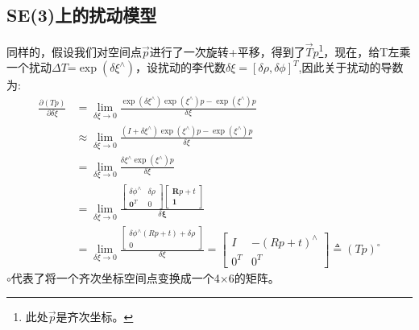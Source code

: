\subsection{SE(3)上的扰动模型}
同样的，假设我们对空间点$\vec p$进行了一次旋转+平移，得到了$\vec T p$\footnote{此处$\vec p$是齐次坐标。}，现在，给T左乘一个扰动$\Delta T$=$\exp{(\delta \xi^\wedge)}$，设扰动的李代数$\delta \xi=[\delta \rho,\delta \phi]^T$,因此关于扰动的导数为:
\begin{equation}
\begin{aligned}
\frac{\partial(T p)}{\partial \delta \xi}
&=\lim _{\delta \xi \rightarrow 0} \frac{\exp \left(\delta \xi^{\wedge}\right) \exp \left(\xi^{\wedge}\right) p-\exp \left(\xi^{\wedge}\right) p}{\delta \xi} \\
& \approx \lim _{\delta \xi \rightarrow 0} \frac{\left(I+\delta \xi^{\wedge}\right) \exp \left(\xi^{\wedge}\right) p-\exp \left(\xi^{\wedge}\right) p}{\delta \xi} \\
&=\lim _{\delta \xi \rightarrow 0} \frac{\delta \xi^{\wedge} \exp \left(\xi^{\wedge}\right) p}{\delta \xi}\\
&=\lim _{\delta \xi \rightarrow 0} \frac{\left[ \begin{array}{cc}{\delta \phi^{\wedge}} & {\delta \rho} \\ {\mathbf{0}^{T}} & {0}\end{array}\right] \left[ \begin{array}{c}{\boldsymbol{R} p+t} \\ {\mathbf{1}}\end{array}\right]}{\delta \boldsymbol{\xi}}\\
&=\lim _{\delta \xi \rightarrow 0} \frac{\left[ \begin{array}{c}{\delta \phi^{\wedge}(R p+t)+\delta \rho} \\ {0}\end{array}\right]}{\delta \xi}=\left[ \begin{array}{cc}{I} & {-(R p+t)^{\wedge}} \\ {0^{T}} & {0^{T}}\end{array}\right] \triangleq(T p)^{\circ}
\end{aligned}
\label{equ:raodong}
\end{equation}
$\circ$代表了将一个齐次坐标空间点变换成一个4$\times$6的矩阵。
























